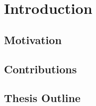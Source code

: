 \chapter{Introduction}\label{chapter:introduction}
\section{Motivation}
\section{Contributions}
\section{Thesis Outline}
